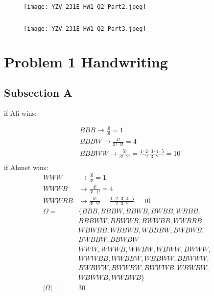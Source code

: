 \documentclass[a4paper,11pt]{article}
\theoremstyle{mytheor}
\begin{document}
\newpage
\inputminted[breaklines]{python}{script_Q2_part2.py}

\begin{figure}[H]
    \centering
    \texttt{[image: YZV\_231E\_HW1\_Q2\_Part2.jpeg]}
    \label{fig:Prob_atleast_60_Stud}
\end{figure}

\newpage
\inputminted[breaklines]{python}{script_Q2_part3.py}

\begin{figure}[H]
    \centering
    \texttt{[image: YZV\_231E\_HW1\_Q2\_Part3.jpeg]}
    \label{fig:CondProb_30_Stud}
\end{figure}




\section{Problem 1 Handwriting}

\subsection{Subsection A}
if Ali wins:

\begin{align*}
& B B B \rightarrow \frac{3 !}{3 !}=1 \\
& B B B W \rightarrow \frac{4 !}{3 ! \cdot 1 !}=4 \\
& B B B W W \rightarrow \frac{5 !}{3 ! \cdot 2 !}=\frac{1 \cdot 2 \cdot 3 \cdot 4 \cdot 5}{2 \cdot 3 \cdot 2}=10\\
\end{align*}
if Ahmet wins:
\begin{align*}
W W W &\rightarrow \frac{3!}{3!} = 1 \\
W W W B &\rightarrow \frac{4!}{3! \cdot 1!} = 4 \\
W W W B B &\rightarrow \frac{5!}{3! \cdot 2!} = \frac{1 \cdot 2 \cdot 3 \cdot 4 \cdot 5}{2 \cdot 3 \cdot 2}=10\\
\Omega= &\{B B B, B B B W, B B W B, B W B B, W B B B, \\
& B B B W W, B B W W B, B W W B B, W W B B B, \\
& W B W B B, W B B W B, W B B B W, B W B W B, \\
& B W B B W, B B W B W \\
& W W W, W W W B, W W B W, W B W W, B W W W, \\
& W W W B B, W W B B W, W B B W W, B B W W W, \\
& B W B W W, B W W B W, B W W W B, W B W B W, \\
& W B W W B, W W B W B\} \\
|\Omega|= & 30
\end{align*}
\end{document}
